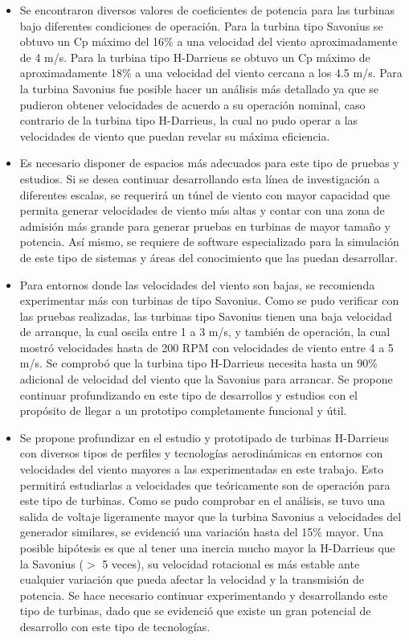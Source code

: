 \documentclass[letterpaper,12pt, oneside]{book}
\begin{document}
\begin{itemize}
   \item Se encontraron diversos valores de coeficientes de potencia para las turbinas bajo diferentes condiciones de operación. Para la turbina tipo Savonius se obtuvo un Cp máximo del 16\% a una velocidad del viento aproximadamente de 4 m/s. Para la turbina tipo H-Darrieus se obtuvo un Cp máximo de aproximadamente 18\% a una velocidad del viento cercana a los 4.5 m/s. Para la turbina Savonius fue posible hacer un análisis más detallado ya que se pudieron obtener velocidades de acuerdo a su operación nominal, caso contrario de la turbina tipo H-Darrieus, la cual no pudo operar a las velocidades de viento que puedan revelar su máxima eficiencia.
   
   \item Es necesario disponer de espacios más adecuados para este tipo de pruebas y estudios. Si se desea continuar desarrollando esta línea de investigación a diferentes escalas, se requerirá un túnel de viento con mayor capacidad que permita generar velocidades de viento más altas y contar con una zona de admisión más grande para generar pruebas en turbinas de mayor tamaño y potencia. Así mismo, se requiere de software especializado para la simulación de este tipo de sistemas y áreas del conocimiento que las puedan desarrollar.
   
   \item Para entornos donde las velocidades del viento son bajas, se recomienda experimentar más con turbinas de tipo Savonius. Como se pudo verificar con las pruebas realizadas, las turbinas tipo Savonius tienen una baja velocidad de arranque, la cual oscila entre 1 a 3 m/s, y también de operación, la cual mostró velocidades hasta de 200 RPM con velocidades de viento entre 4 a 5 m/s. Se comprobó que la turbina tipo H-Darrieus necesita hasta un 90\% adicional de velocidad del viento que la Savonius para arrancar. Se propone continuar profundizando en este tipo de desarrollos y estudios con el propósito de llegar a un prototipo completamente funcional y útil.
   
   \item Se propone profundizar en el estudio y prototipado de turbinas H-Darrieus con diversos tipos de perfiles y tecnologías aerodinámicas en entornos con velocidades del viento mayores a las experimentadas en este trabajo. Esto permitirá estudiarlas a velocidades que teóricamente son de operación para este tipo de turbinas. Como se pudo comprobar en el análisis, se tuvo una salida de voltaje ligeramente mayor que la turbina Savonius a velocidades del generador similares, se evidenció una variación hasta del 15\% mayor. Una posible hipótesis es que al tener una inercia mucho mayor la H-Darrieus que la Savonius ($>$ 5 veces), su velocidad rotacional es más estable ante cualquier variación que pueda afectar la velocidad y la transmisión de potencia. Se hace necesario continuar experimentando y desarrollando este tipo de turbinas, dado que se evidenció que existe un gran potencial de desarrollo con este tipo de tecnologías.
\end{itemize}
\end{document}
